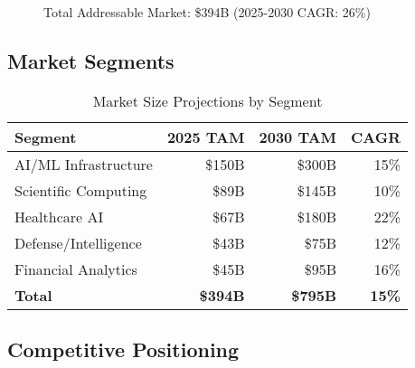 \documentclass[11pt,letterpaper]{article}
\begin{document}
\begin{figure}[H]
\centering
{}
\caption{Total Addressable Market: \$394B (2025-2030 CAGR: 26\%)}
\end{figure}

\subsection{Market Segments}

\begin{table}[H]
\centering
\begin{tabularx}{\textwidth}{Xrrr}
\toprule
\textbf{Segment} & \textbf{2025 TAM} & \textbf{2030 TAM} & \textbf{CAGR} \\
\midrule
AI/ML Infrastructure & \$150B & \$300B & 15\% \\
Scientific Computing & \$89B & \$145B & 10\% \\
Healthcare AI & \$67B & \$180B & 22\% \\
Defense/Intelligence & \$43B & \$75B & 12\% \\
Financial Analytics & \$45B & \$95B & 16\% \\
\midrule
\textbf{Total} & \textbf{\$394B} & \textbf{\$795B} & \textbf{15\%} \\
\bottomrule
\end{tabularx}
\caption{Market Size Projections by Segment}
\end{table}

\subsection{Competitive Positioning}
\end{document}
